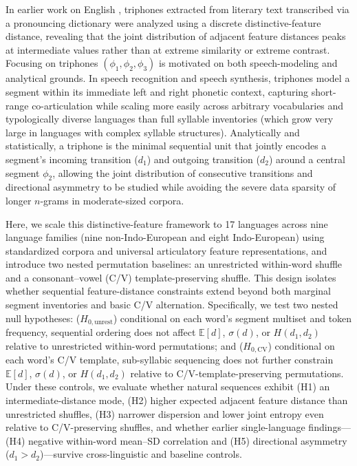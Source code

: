 \documentclass[cm]{glossa}
\begin{document}
In earlier work on English \citep{araujo2013thesis}, triphones extracted from literary text transcribed via a pronouncing dictionary were analyzed using a discrete distinctive-feature distance, revealing that the joint distribution of adjacent feature distances peaks at intermediate values rather than at extreme similarity or extreme contrast. Focusing on triphones $(\phi_1, \phi_2, \phi_3)$ is motivated on both speech-modeling and analytical grounds. In speech recognition and speech synthesis, triphones model a segment within its immediate left and right phonetic context, capturing short-range co-articulation while scaling more easily across arbitrary vocabularies and typologically diverse languages than full syllable inventories (which grow very large in languages with complex syllable structures). Analytically and statistically, a triphone is the minimal sequential unit that jointly encodes a segment's incoming transition ($d_1$) and outgoing transition ($d_2$) around a central segment $\phi_2$, allowing the joint distribution of consecutive transitions and directional asymmetry to be studied while avoiding the severe data sparsity of longer $n$-grams in moderate-sized corpora.

Here, we scale this distinctive-feature framework to 17 languages across nine language families (nine non-Indo-European and eight Indo-European) using standardized corpora and universal articulatory feature representations, and introduce two nested permutation baselines: an unrestricted within-word shuffle and a consonant--vowel (C/V) template-preserving shuffle. This design isolates whether sequential feature-distance constraints extend beyond both marginal segment inventories and basic C/V alternation. Specifically, we test two nested null hypotheses: ($H_{0,\text{unrest}}$) conditional on each word's segment multiset and token frequency, sequential ordering does not affect $\mathbb{E}[d]$, $\sigma(d)$, or $H(d_1, d_2)$ relative to unrestricted within-word permutations; and ($H_{0,\text{CV}}$) conditional on each word's C/V template, sub-syllabic sequencing does not further constrain $\mathbb{E}[d]$, $\sigma(d)$, or $H(d_1, d_2)$ relative to C/V-template-preserving permutations. Under these controls, we evaluate whether natural sequences exhibit (H1) an intermediate-distance mode, (H2) higher expected adjacent feature distance than unrestricted shuffles, (H3) narrower dispersion and lower joint entropy even relative to C/V-preserving shuffles, and whether earlier single-language findings---(H4) negative within-word mean--SD correlation and (H5) directional asymmetry ($d_1 > d_2$)---survive cross-linguistic and baseline controls.
\end{document}
